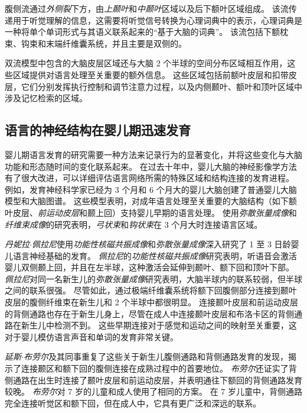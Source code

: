 腹侧流通过\textit{外侧裂}下方，由\textit{上颞叶}和\textit{中颞叶}区域以及后下额叶区域组成。
该流传递用于听觉理解的信息，这需要将听觉信号转换为心理词典中的表示，心理词典是一种将单个单词形式与其语义联系起来的“基于大脑的词典”。
该流包括下额枕束、钩束和末端纤维囊系统，并且主要是双侧的。


双流模型中包含的大脑皮层区域还与大脑 2 个半球的空间分布区域相互作用，这些区域提供对语言处理至关重要的额外信息。
这些区域包括前额叶皮层和扣带皮层，它们分别发挥执行控制和调节注意力过程，以及内侧颞叶、额叶和顶叶区域中涉及记忆检索的区域。




\subsection{语言的神经结构在婴儿期迅速发育}

婴儿期语言发育的研究需要一种方法来记录行为的显著变化，并将这些变化与大脑功能和形态随时间的变化联系起来。
在过去十年中，婴儿大脑的神经影像学方法有了很大改进，可以详细评估语言网络所需的特殊区域和结构连接的发育进程。
例如，发育神经科学家已经为 3 个月和 6 个月大的婴儿大脑创建了普通婴儿大脑模型和大脑图谱。
这些模型表明，对成年语言处理至关重要的大脑结构（如下额叶皮层、\textit{前运动皮层}和颞上回）支持婴儿早期的语言处理。
使用\textit{弥散张量成像}和\textit{纤维束成像}的研究表明，\textit{弓状束}和\textit{钩状束}在 3 个月大时连接语言区域。


\textit{丹妮拉$\cdot$佩拉尼}使用\textit{功能性核磁共振成像}和\textit{弥散张量成像}深入研究了 1 至 3 日龄婴儿语言神经基础的发育。
\textit{佩拉尼}的\textit{功能性核磁共振成像}研究表明，听语音会激活婴儿双侧颞上回，并且在左半球，这种激活会延伸到颞叶、额下回和顶叶下部。
\textit{佩拉尼}对同一名新生儿的\textit{弥散张量成像}研究表明，大脑半球内的联系较弱，但半球之间的联系很强。
尽管如此，通过极端纤维囊系统将额下回腹侧部分连接到颞叶皮层的腹侧纤维束在新生儿和 2 个半球中都很明显。
连接颞叶皮层和前运动皮层的背侧通路也存在于新生儿身上，尽管在成人中连接颞叶皮层和布洛卡区的背侧通路在新生儿中检测不到。
这些早期连接对于感觉和运动之间的映射至关重要，这对于婴儿模仿语言声音和单词的发育非常关键。


\textit{延斯$\cdot$布劳尔}及其同事重复了这些关于新生儿腹侧通路和背侧通路发育的发现，揭示了连接颞区和额下回的腹侧连接在成熟过程中的首要地位。
\textit{布劳尔}还证实了背侧通路在出生时连接了颞叶皮层和前运动皮层，并表明通往下额回的背侧通路发育较晚。
\textit{布劳尔}对 7 岁的儿童和成人使用了相同的方案。
在 7 岁儿童中，背侧通路完全连接听觉区和额下回，但在成人中，它具有更广泛和深远的联系。


